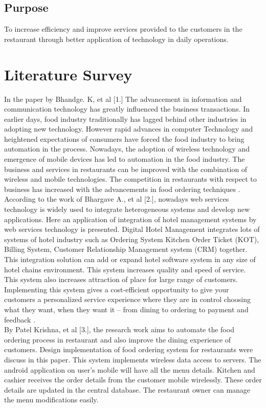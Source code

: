 \documentclass[english]{article}
\begin{document}
\subsection{Purpose}
To increase efficiency and improve services provided to the customers in the restaurant
through better application of technology in daily operations.


\section{Literature Survey} %


In the paper by Bhandge. K, et al [1.] The advancement in information and communication
technology has greatly influenced the business transactions. In
earlier days, food industry traditionally has lagged behind other
industries in adopting new technology. However rapid advances
in computer Technology and heightened expectations of
consumers have forced the food industry to bring automation in
the process. Nowadays, the adoption of wireless technology and
emergence of mobile devices has led to automation in the food
industry. The business and services in restaurants can be
improved with the combination of wireless and mobile
technologies. The competition in restaurants with respect to
business has increased with the advancements in food ordering
techniques .\\

According to the work of Bhargave A., et al [2.], nowadays web services technology is widely used to integrate
heterogeneous systems and develop new applications. Here an
application of integration of hotel management systems by web
services technology is presented. Digital Hotel Management
integrates lots of systems of hotel industry such as Ordering
System Kitchen Order Ticket (KOT), Billing System, Customer
Relationship Management system (CRM) together. This
integration solution can add or expand hotel software system in
any size of hotel chains environment. This system increases
quality and speed of service. This system also increases attraction
of place for large range of customers. Implementing this system
gives a cost-efficient opportunity to give your customers a
personalized service experience where they are in control
choosing what they want, when they want it – from dining to
ordering to payment and feedback .\\

\clearpage %
By Patel Krishna, et al [3.], the research work aims to automate the food
ordering process in restaurant and also improve the dining
experience of customers. Design implementation of food
ordering system for restaurants were discuss in this paper.
This system implements wireless data access to servers. The
android application on user’s mobile will have all the menu
details. Kitchen and cashier receives the order details from
the customer mobile wirelessly. These order details are
updated in the central database. The restaurant owner can
manage the menu modifications easily.\\
\end{document}

